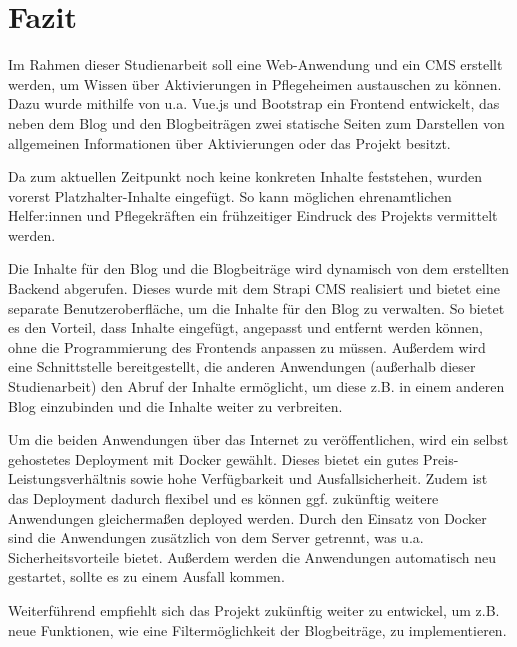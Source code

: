 \chapter{Fazit}

Im Rahmen dieser Studienarbeit soll eine Web-Anwendung und ein \ac{CMS} erstellt werden, um Wissen über Aktivierungen in Pflegeheimen austauschen zu können. Dazu wurde mithilfe von u.a. Vue.js und Bootstrap ein Frontend entwickelt, das neben dem Blog und den Blogbeiträgen zwei statische Seiten zum Darstellen von allgemeinen Informationen über Aktivierungen oder das Projekt besitzt.

Da zum aktuellen Zeitpunkt noch keine konkreten Inhalte feststehen, wurden vorerst Platzhalter-Inhalte eingefügt. So kann möglichen ehrenamtlichen Helfer:innen und Pflegekräften ein frühzeitiger Eindruck des Projekts vermittelt werden.

Die Inhalte für den Blog und die Blogbeiträge wird dynamisch von dem erstellten Backend abgerufen. Dieses wurde mit dem Strapi \ac{CMS} realisiert und bietet eine separate Benutzeroberfläche, um die Inhalte für den Blog zu verwalten. So bietet es den Vorteil, dass Inhalte eingefügt, angepasst und entfernt werden können, ohne die Programmierung des Frontends anpassen zu müssen. Außerdem wird eine Schnittstelle bereitgestellt, die anderen Anwendungen (außerhalb dieser Studienarbeit) den Abruf der Inhalte ermöglicht, um diese z.B. in einem anderen Blog einzubinden und die Inhalte weiter zu verbreiten.

Um die beiden Anwendungen über das Internet zu veröffentlichen, wird ein selbst gehostetes Deployment mit Docker gewählt. Dieses bietet ein gutes Preis-Leistungsverhältnis sowie hohe Verfügbarkeit und Ausfallsicherheit. Zudem ist das Deployment dadurch flexibel und es können ggf. zukünftig weitere Anwendungen gleichermaßen deployed werden. Durch den Einsatz von Docker sind die Anwendungen zusätzlich von dem Server getrennt, was u.a. Sicherheitsvorteile bietet. Außerdem werden die Anwendungen automatisch neu gestartet, sollte es zu einem Ausfall kommen.

Weiterführend empfiehlt sich das Projekt zukünftig weiter zu entwickel, um z.B. neue Funktionen, wie eine Filtermöglichkeit der Blogbeiträge, zu implementieren.
